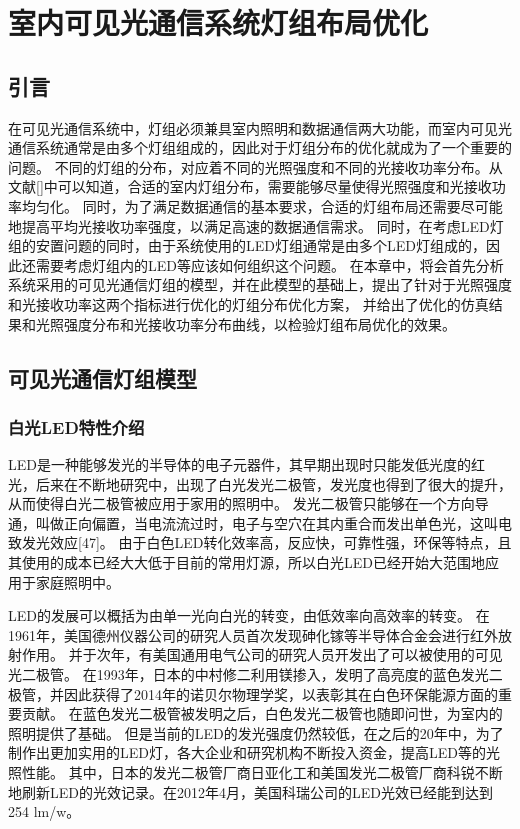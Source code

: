
\chapter{室内可见光通信系统灯组布局优化}\label{chap:led-layout}
\section{引言}
在可见光通信系统中，灯组必须兼具室内照明和数据通信两大功能，而室内可见光通信系统通常是由多个灯组组成的，因此对于灯组分布的优化就成为了一个重要的问题。
不同的灯组的分布，对应着不同的光照强度和不同的光接收功率分布。从文献[]中可以知道，合适的室内灯组分布，需要能够尽量使得光照强度和光接收功率均匀化。
同时，为了满足数据通信的基本要求，合适的灯组布局还需要尽可能地提高平均光接收功率强度，以满足高速的数据通信需求。
同时，在考虑LED灯组的安置问题的同时，由于系统使用的LED灯组通常是由多个LED灯组成的，因此还需要考虑灯组内的LED等应该如何组织这个问题。
在本章中，将会首先分析系统采用的可见光通信灯组的模型，并在此模型的基础上，提出了针对于光照强度和光接收功率这两个指标进行优化的灯组分布优化方案，
并给出了优化的仿真结果和光照强度分布和光接收功率分布曲线，以检验灯组布局优化的效果。

\section{可见光通信灯组模型}\label{sec:led-model}
\subsection{白光LED特性介绍}
LED是一种能够发光的半导体的电子元器件，其早期出现时只能发低光度的红光，后来在不断地研究中，出现了白光发光二极管，发光度也得到了很大的提升，从而使得白光二极管被应用于家用的照明中。
发光二极管只能够在一个方向导通，叫做正向偏置，当电流流过时，电子与空穴在其内重合而发出单色光，这叫电致发光效应[47]。
由于白色LED转化效率高，反应快，可靠性强，环保等特点，且其使用的成本已经大大低于目前的常用灯源，所以白光LED已经开始大范围地应用于家庭照明中。

LED的发展可以概括为由单一光向白光的转变，由低效率向高效率的转变。
在1961年，美国德州仪器公司的研究人员首次发现砷化镓等半导体合金会进行红外放射作用。
并于次年，有美国通用电气公司的研究人员开发出了可以被使用的可见光二极管。
在1993年，日本的中村修二利用镁掺入，发明了高亮度的蓝色发光二极管，并因此获得了2014年的诺贝尔物理学奖，以表彰其在白色环保能源方面的重要贡献。
在蓝色发光二极管被发明之后，白色发光二极管也随即问世，为室内的照明提供了基础。
但是当前的LED的发光强度仍然较低，在之后的20年中，为了制作出更加实用的LED灯，各大企业和研究机构不断投入资金，提高LED等的光照性能。
其中，日本的发光二极管厂商日亚化工和美国发光二极管厂商科锐不断地刷新LED的光效记录。在2012年4月，美国科瑞公司的LED光效已经能到达到254 lm/w。

